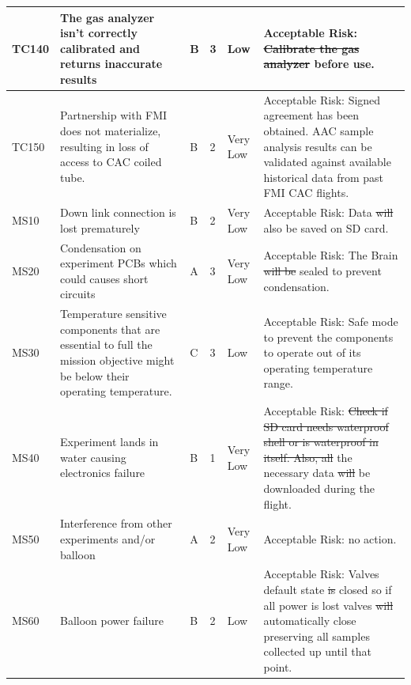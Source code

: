 \documentclass[a4paper,12pt,oneside]{article}
\providecommand{\DIFaddtex}[1]{{\protect\color{blue}\uwave{#1}}} %
\providecommand{\DIFdeltex}[1]{{\protect\color{red}\sout{#1}}}                      %
\providecommand{\DIFaddbegin}{} %
\providecommand{\DIFaddend}{} %
\providecommand{\DIFdelbegin}{} %
\providecommand{\DIFdelend}{} %
\providecommand{\DIFadd}[1]{\texorpdfstring{\DIFaddtex{#1}}{#1}} %
\providecommand{\DIFdel}[1]{\texorpdfstring{\DIFdeltex{#1}}{}} %
\newcommand{\DIFscaledelfig}{0.5}
\newlength{\DIFdelgraphicswidth} %
\newlength{\DIFdelgraphicsheight} %
\newcommand{\DIFaddincludegraphics}[2][]{{\color{blue}\fbox{\DIFOincludegraphics[#1]{#2}}}} %
\newcommand{\DIFdelincludegraphics}[2][]{%
\sbox{\DIFdelgraphicsbox}{\DIFOincludegraphics[#1]{#2}}%
\settoboxwidth{\DIFdelgraphicswidth}{\DIFdelgraphicsbox} %
\settoboxtotalheight{\DIFdelgraphicsheight}{\DIFdelgraphicsbox} %
\scalebox{\DIFscaledelfig}{%
\parbox[b]{\DIFdelgraphicswidth}{\usebox{\DIFdelgraphicsbox}\\[-\baselineskip] \rule{\DIFdelgraphicswidth}{0em}}\llap{\resizebox{\DIFdelgraphicswidth}{\DIFdelgraphicsheight}{%
\setlength{\unitlength}{\DIFdelgraphicswidth}%
\begin{picture}(1,1)%
\thicklines\linethickness{2pt} %
{\color[rgb]{1,0,0}\put(0,0){\framebox(1,1){}}}%
{\color[rgb]{1,0,0}\put(0,0){\line( 1,1){1}}}%
{\color[rgb]{1,0,0}\put(0,1){\line(1,-1){1}}}%
\end{picture}%
}\hspace*{3pt}}} %
} %
\DeclareRobustCommand{\DIFaddbegin}{\DIFOaddbegin \let\includegraphics\DIFaddincludegraphics} %
\DeclareRobustCommand{\DIFaddend}{\DIFOaddend \let\includegraphics\DIFOincludegraphics} %
\DeclareRobustCommand{\DIFdelbegin}{\DIFOdelbegin \let\includegraphics\DIFdelincludegraphics} %
\DeclareRobustCommand{\DIFdelend}{\DIFOaddend \let\includegraphics\DIFOincludegraphics} %
\begin{document}
\begin{landscape}
\begin{longtable}{|m{}| m{} |m{} |m{}|m{}| m{}|}
TC140 & The gas analyzer isn't correctly calibrated and returns inaccurate results & B & 3 & \cellcolor[HTML]{FCFF2F}Low & Acceptable Risk: \DIFdelbegin \DIFdel{Calibrate the gas analyzer }\DIFdelend \DIFaddbegin \DIFadd{Gas analyzer was calibrated }\DIFaddend before use.\\ \hline 
TC150 & Partnership with FMI does not materialize, resulting in loss of access to CAC coiled tube. & B & 2 & \cellcolor[HTML]{34FF34}Very Low & Acceptable Risk: Signed agreement has been obtained. AAC sample analysis results can be validated against available historical data from past FMI CAC flights. \\ \hline 
MS10 & Down link connection is lost prematurely & B & 2 & \cellcolor[HTML]{34FF34}Very Low & Acceptable Risk: Data \DIFdelbegin \DIFdel{will }\DIFdelend \DIFaddbegin \DIFadd{was }\DIFaddend also be saved on SD card. \\ \hline
MS20 & Condensation on experiment PCBs which could causes short circuits & A & 3 & \cellcolor[HTML]{34FF34}Very Low & Acceptable Risk: The Brain \DIFdelbegin \DIFdel{will be }\DIFdelend \DIFaddbegin \DIFadd{was }\DIFaddend sealed to prevent condensation. \\ \hline
MS30 & Temperature sensitive components that are essential to full the mission objective might be below their operating temperature. & C & 3 & \cellcolor[HTML]{FCFF2F}Low & Acceptable Risk: Safe mode to prevent the components to operate out of its operating temperature range. \\ \hline
MS40 & Experiment lands in water causing electronics failure & B & 1 & \cellcolor[HTML]{34FF34}Very Low & Acceptable Risk: \DIFdelbegin \DIFdel{Check if SD card needs waterproof shell or is waterproof in itself. Also, all }\DIFdelend \DIFaddbegin \DIFadd{All }\DIFaddend the necessary data \DIFdelbegin \DIFdel{will }\DIFdelend \DIFaddbegin \DIFadd{was }\DIFaddend be downloaded during the flight. \\ \hline
MS50 & Interference from other experiments and/or balloon & A & 2 & \cellcolor[HTML]{34FF34}Very Low & Acceptable Risk: no action. \\ \hline
MS60 & Balloon power failure & B & 2 & \cellcolor[HTML]{FCFF2F}Low & Acceptable Risk: Valves default state \DIFdelbegin \DIFdel{is }\DIFdelend \DIFaddbegin \DIFadd{was }\DIFaddend closed so if all power is lost valves \DIFdelbegin \DIFdel{will }\DIFdelend \DIFaddbegin \DIFadd{would }\DIFaddend automatically close preserving all samples collected up until that point. \\ \hline

\end{longtable}
\end{landscape}
\end{document}
